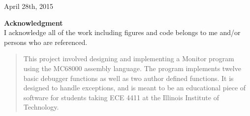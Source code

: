 \documentclass[12pt]{article}
\begin{document}
\begin{titlepage}
		
		
		{\large April 28th, 2015}\\[3cm] %
		
		
		
		
		\vfill %
		
		\textbf{Acknowledgment} \\ \flushleft I acknowledge all of the work including figures and code belongs to me and/or persons who are referenced.
	\end{titlepage}
	
	\tableofcontents
	\newpage
	\begin{abstract}
		This project involved designing and implementing a Monitor program using the MC68000 assembly language. The program implements twelve basic debugger functions as well as two author defined functions. It is designed to handle exceptions, and is meant to be an educational piece of software for students taking ECE 4411 at the Illinois Institute of Technology.
	\end{abstract}
	
\end{document}
